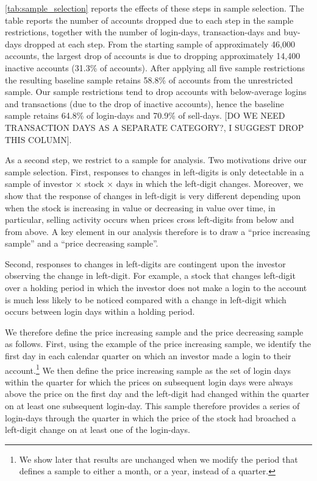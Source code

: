 \ref{tab:sample_selection} reports the effects of these steps in sample selection. The table reports the number of accounts dropped due to each step in the sample restrictions, together with the number of login-days, transaction-days and buy-days dropped at each step. From the starting sample of approximately 46,000 accounts, the largest drop of accounts is due to dropping approximately 14,400 inactive accounts (31.3\% of accounts). After applying all five sample restrictions the resulting baseline sample retains 58.8\% of accounts from the unrestricted sample. Our sample restrictions tend to drop accounts with below-average logins and transactions (due to the drop of inactive accounts), hence the baseline sample retains 64.8\% of login-days and 70.9\% of sell-days. [DO WE NEED TRANSACTION DAYS AS A SEPARATE CATEGORY?, I SUGGEST DROP THIS COLUMN].

As a second step, we restrict to a sample for analysis. Two motivations drive our sample selection. First, responses to changes in left-digits is only detectable in a sample of investor $\times$ stock $\times$ days in which the left-digit changes. Moreover, we show that the response of changes in left-digit is very different depending upon when the stock is increasing in value or decreasing in value over time, in particular, selling activity occurs when prices cross left-digits from below and from above. A key element in our analysis therefore is to draw a ``price increasing sample'' and a ``price decreasing sample''. 

Second, responses to changes in left-digits are contingent upon the investor observing the change in left-digit. For example, a stock that changes left-digit over a holding period in which the investor does not make a login to the account is much less likely to be noticed compared with a change in left-digit which occurs between login days within a holding period.

We therefore define the price increasing sample and the price decreasing sample as follows. First, using the example of the price increasing sample, we identify the first day in each calendar quarter on which an investor made a login to their account.\footnote{We show later that results are unchanged when we modify the period that defines a sample to either a month, or a year, instead of a quarter.} We then define the price increasing sample as the set of login days within the quarter for which the prices on subsequent login days were always above the price on the first day and the left-digit had changed within the quarter on at least one subsequent login-day. This sample therefore provides a series of login-days through the quarter in which the price of the stock had broached a left-digit change on at least one of the login-days. 

